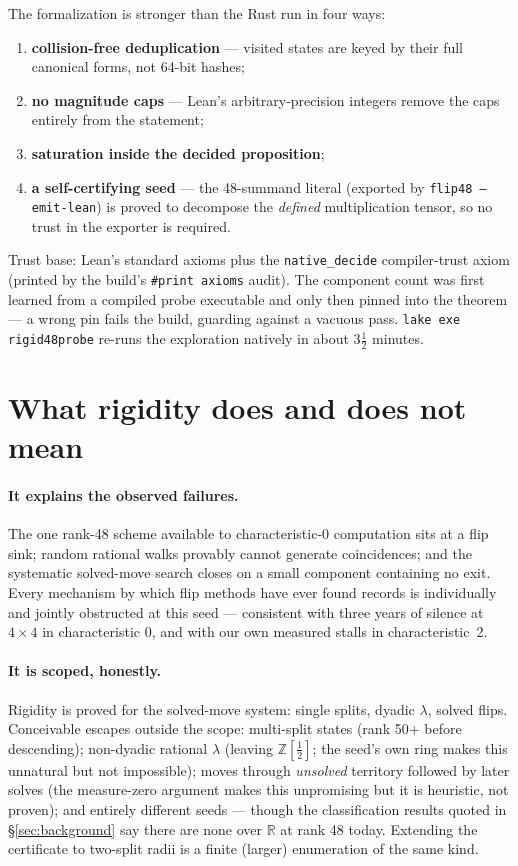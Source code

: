 \documentclass[10pt]{article}
\begin{document}
The formalization is stronger than the Rust run in four ways:
\begin{enumerate}
\item \textbf{collision-free deduplication} --- visited states are
  keyed by their full canonical forms, not 64-bit hashes;
\item \textbf{no magnitude caps} --- Lean's arbitrary-precision
  integers remove the caps entirely from the statement;
\item \textbf{saturation inside the decided proposition};
\item \textbf{a self-certifying seed} --- the 48-summand literal
  (exported by \texttt{flip48 --emit-lean}) is proved to decompose
  the \emph{defined} multiplication tensor, so no trust in the
  exporter is required.
\end{enumerate}

Trust base: Lean's standard axioms plus the \texttt{native\_decide}
compiler-trust axiom (printed by the build's \texttt{\#print axioms}
audit). The component count was first learned from a compiled probe
executable and only then pinned into the theorem --- a wrong pin
fails the build, guarding against a vacuous pass.
\texttt{lake exe rigid48probe} re-runs the exploration natively in
about $3\tfrac12$ minutes.

\section{What rigidity does and does not mean}\label{sec:discussion}

\paragraph{It explains the observed failures.}
The one rank-48 scheme available to characteristic-0 computation sits
at a flip sink; random rational walks provably cannot generate
coincidences; and the systematic solved-move search closes on a small
component containing no exit. Every mechanism by which flip methods
have ever found records is individually and jointly obstructed at
this seed --- consistent with three years of silence at $4\times4$ in
characteristic 0, and with our own measured stalls in
characteristic~2.

\paragraph{It is scoped, honestly.}
Rigidity is proved for the solved-move system: single splits, dyadic
$\lambda$, solved flips. Conceivable escapes outside the scope:
multi-split states (rank 50+ before descending); non-dyadic rational
$\lambda$ (leaving $\mathbb{Z}[\tfrac12]$; the seed's own ring makes
this unnatural but not impossible); moves through \emph{unsolved}
territory followed by later solves (the measure-zero argument makes
this unpromising but it is heuristic, not proven); and entirely
different seeds --- though the classification results quoted in
\S\ref{sec:background} say there are none over $\mathbb{R}$ at rank
48 today. Extending the certificate to two-split radii is a finite
(larger) enumeration of the same kind.
\end{document}
